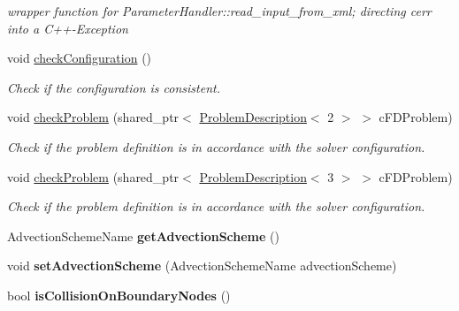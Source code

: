 \begin{DoxyCompactItemize}
\begin{DoxyCompactList}\small\item\em wrapper function for Parameter\-Handler\-::read\-\_\-input\-\_\-from\-\_\-xml; directing cerr into a C++-\/\-Exception \end{DoxyCompactList}\item 
void \hyperlink{classnatrium_1_1SolverConfiguration_a06547d0908d22a6f4f0bde286ba0c4fc}{check\-Configuration} ()
\begin{DoxyCompactList}\small\item\em Check if the configuration is consistent. \end{DoxyCompactList}\item 
void \hyperlink{classnatrium_1_1SolverConfiguration_a49e6c9cd57689289c79b47a6104b483a}{check\-Problem} (shared\-\_\-ptr$<$ \hyperlink{classnatrium_1_1ProblemDescription}{Problem\-Description}$<$ 2 $>$ $>$ c\-F\-D\-Problem)
\begin{DoxyCompactList}\small\item\em Check if the problem definition is in accordance with the solver configuration. \end{DoxyCompactList}\item 
void \hyperlink{classnatrium_1_1SolverConfiguration_af13da3022a9f995ce09b0918092da0c9}{check\-Problem} (shared\-\_\-ptr$<$ \hyperlink{classnatrium_1_1ProblemDescription}{Problem\-Description}$<$ 3 $>$ $>$ c\-F\-D\-Problem)
\begin{DoxyCompactList}\small\item\em Check if the problem definition is in accordance with the solver configuration. \end{DoxyCompactList}\item 
\hypertarget{classnatrium_1_1SolverConfiguration_aaf32180358f99d78d56b3435dff11a11}{Advection\-Scheme\-Name {\bfseries get\-Advection\-Scheme} ()}\label{classnatrium_1_1SolverConfiguration_aaf32180358f99d78d56b3435dff11a11}

\item 
\hypertarget{classnatrium_1_1SolverConfiguration_a4fef165cd5a17247203af08846ec0f31}{void {\bfseries set\-Advection\-Scheme} (Advection\-Scheme\-Name advection\-Scheme)}\label{classnatrium_1_1SolverConfiguration_a4fef165cd5a17247203af08846ec0f31}

\item 
\hypertarget{classnatrium_1_1SolverConfiguration_a8a0bc2d24b247244790f1d50323ace4c}{bool {\bfseries is\-Collision\-On\-Boundary\-Nodes} ()}\label{classnatrium_1_1SolverConfiguration_a8a0bc2d24b247244790f1d50323ace4c}


\end{DoxyCompactItemize}
